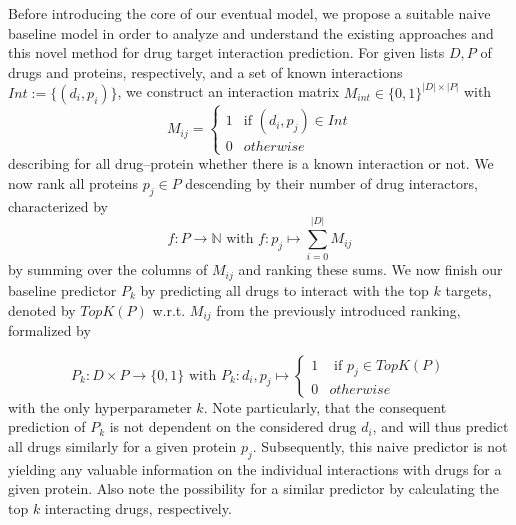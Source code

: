 \documentclass{bioinfo}
\begin{document}
Before introducing the core of our eventual model, we propose a suitable naive baseline model in order to analyze and understand the existing approaches and this novel method for drug target interaction prediction. For given lists $D, P$ of drugs and proteins, respectively, and a set of known interactions $Int := \{(d_i, p_i) \}$, we construct an interaction matrix $M_{int}\in\{0,1\}^{|D|\times|P|}$ with 
\begin{equation*}
	M_{ij} = \begin{cases}
		1 & \text{if } (d_i, p_j)\in Int\\
		0 & otherwise
	\end{cases}
\end{equation*}
describing for all drug--protein whether there is a known interaction or not. We now rank all proteins $p_j\in P$ descending by their number of drug interactors, characterized by 
\begin{equation*}
	f: P \rightarrow \mathbb{N} \text{ with } f:p_j \mapsto \sum_{i=0}^{|D|}M_{ij}
\end{equation*}
by summing over the columns of $M_{ij}$ and ranking these sums.
We now finish our baseline predictor $P_k$ by predicting all drugs to interact with the top $k$ targets, denoted by $TopK(P)$ w.r.t. $M_{ij}$ from the previously introduced ranking, formalized by 

\begin{equation*}
	P_k: D\times P \rightarrow \{0,1\} \text{ with } P_k: d_i, p_j \mapsto \begin{cases}
		1 & \text{ if }p_j \in TopK(P)\\
		0 & otherwise
	\end{cases}
\end{equation*}
with the only hyperparameter $k$. Note particularly, that the consequent prediction of $P_k$ is not dependent on the considered drug $d_i$, and will thus predict all drugs similarly for a given protein $p_j$. Subsequently, this naive predictor is not yielding any valuable information on the individual interactions with drugs for a given protein. Also note the possibility for a similar predictor by calculating the top $k$ interacting drugs, respectively.
\end{document}
